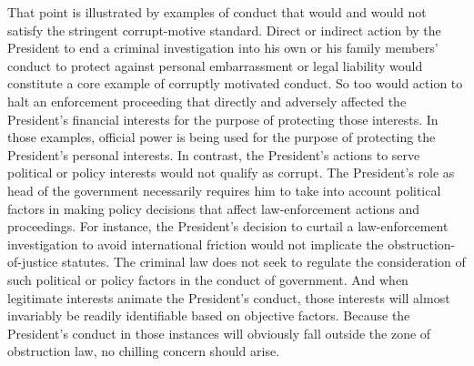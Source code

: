 That point is illustrated by examples of conduct that would and would not satisfy the stringent corrupt-motive standard.
Direct or indirect action by the President to end a criminal investigation into his own or his family members' conduct to protect against personal embarrassment or legal liability would constitute a core example of corruptly motivated conduct.
So too would action to halt an enforcement proceeding that directly and adversely affected the President's financial interests for the purpose of protecting those interests.
In those examples, official power is being used for the purpose of protecting the President's personal interests.
In contrast, the President's actions to serve political or policy interests would not qualify as corrupt.
The President's role as head of the government necessarily requires him to take into account political factors in making policy decisions that affect law-enforcement actions and proceedings.
For instance, the President's decision to curtail a law-enforcement investigation to avoid international friction would not implicate the obstruction-of-justice statutes.
The criminal law does not seek to regulate the consideration of such political or policy factors in the conduct of government.
And when legitimate interests animate the President's conduct, those interests will almost invariably be readily identifiable based on objective factors.
Because the President's conduct in those instances will obviously fall outside the zone of obstruction law, no chilling concern should arise.

